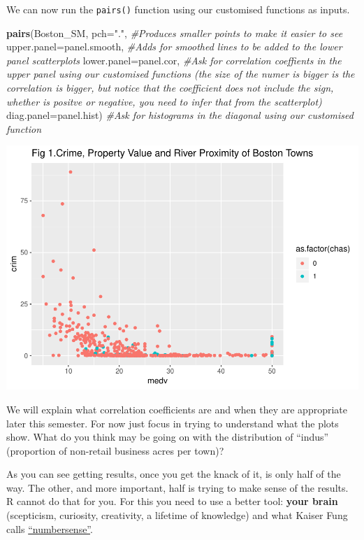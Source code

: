 \documentclass[]{book}
\newenvironment{Shaded}{\begin{snugshade}}{\end{snugshade}}
\newcommand{\CommentTok}[1]{\textcolor[rgb]{0.56,0.35,0.01}{\textit{#1}}}
\newcommand{\DataTypeTok}[1]{\textcolor[rgb]{0.13,0.29,0.53}{#1}}
\newcommand{\KeywordTok}[1]{\textcolor[rgb]{0.13,0.29,0.53}{\textbf{#1}}}
\newcommand{\NormalTok}[1]{#1}
\newcommand{\StringTok}[1]{\textcolor[rgb]{0.31,0.60,0.02}{#1}}
\theoremstyle{definition}
\theoremstyle{definition}
\theoremstyle{definition}
\theoremstyle{remark}
\begin{document}
We can now run the \texttt{pairs()} function using our customised
functions as inputs.

\begin{Shaded}
\begin{Highlighting}[]
\KeywordTok{pairs}\NormalTok{(Boston_SM, }\DataTypeTok{pch=}\StringTok{"."}\NormalTok{, }\CommentTok{#Produces smaller points to make it easier to see}
      \DataTypeTok{upper.panel=}\NormalTok{panel.smooth, }\CommentTok{#Adds for smoothed lines to be added to the lower panel scatterplots }
      \DataTypeTok{lower.panel=}\NormalTok{panel.cor, }\CommentTok{#Ask for correlation coeffients in the upper panel using our customised functions (the size of the numer is bigger is the correlation is bigger, but notice that the coefficient does not include the sign, whether is positve or negative, you need to infer that from the scatterplot)}
      \DataTypeTok{diag.panel=}\NormalTok{panel.hist) }\CommentTok{#Ask for histograms in the diagonal using our customised function}
\end{Highlighting}
\end{Shaded}

\includegraphics{03-visualisation_files/figure-latex/unnamed-chunk-54-1.pdf}

We will explain what correlation coefficients are and when they are
appropriate later this semester. For now just focus in trying to
understand what the plots show. What do you think may be going on with
the distribution of ``indus'' (proportion of non-retail business acres
per town)?

As you can see getting results, once you get the knack of it, is only
half of the way. The other, and more important, half is trying to make
sense of the results. R cannot do that for you. For this you need to use
a better tool: \textbf{your brain} (scepticism, curiosity, creativity, a
lifetime of knowledge) and what Kaiser Fung calls
\href{http://www.amazon.co.uk/Numbersense-How-Data-Your-Advantage/dp/0071799664}{``numbersense''}.
\end{document}
